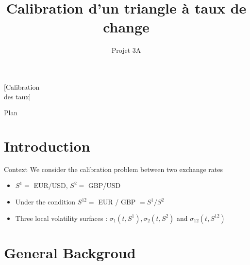 \documentclass[10pt]{beamer} %
\begin{document}
	
	\title[
    \begin{tabular}{l l}
    Tuteur : &Benjamin Jourdain \\
    Élèves : &Lucas Furquim \\
    &Felipe García \\
    \end{tabular}
    ]{Calibration d'un triangle à taux de change}[Calibration\\ des taux]
	\author[]{Projet 3A}
		
	\maketitle
	
	\begin{frame}[t]{Plan}
		\tableofcontents
	\end{frame}
	
	\section{Introduction} %
	\label{sec:introduction}

	\begin{frame}[t]{Context}
		We consider the calibration problem between two exchange rates 
		\begin{itemize}
			\item<+-> $S^1 = $ EUR/USD, $S^2 = $ GBP/USD
			\item<+-> Under the condition $S^{12} = $ EUR / GBP $=S^1/S^2$
			\item<+-> Three local volatility surfaces : $\sigma_1(t, S^1), \sigma_2(t, S^2)$ and $\sigma_{12}(t, S^{12})$
		\end{itemize}		
	\end{frame}
    
    \section{General Backgroud}
    
\end{document}
